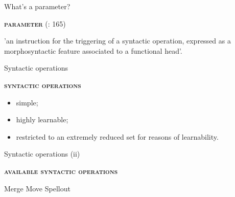 \documentclass[lesson_slides]{subfiles}
\begin{document}
\begin{frame}[c]{What's a parameter?}

    \textbf{\textsc{parameter}} (\cite{rizzi2017}: 165) \pause
    
    'an instruction for the triggering of a syntactic operation, expressed as a morphosyntactic feature
associated to a functional head'.

\end{frame}
\begin{frame}[c]{Syntactic operations}

    \noindent\textbf{\textsc{syntactic operations}} \pause
    \begin{itemize}
        \item[\ding{227}] simple; \pause
        \item[\ding{227}] highly learnable; \pause
        \item[\ding{227}] restricted to an extremely reduced set for reasons of learnability.
    \end{itemize}	
    
\end{frame}
\begin{frame}[c]{Syntactic operations (ii)}

    \noindent\textbf{\textsc{available syntactic operations}} \pause
        \begin{xlist}
            \ex Merge \pause
            \ex Move \pause
            \ex Spellout
        \end{xlist}
\end{frame}
\end{document}
